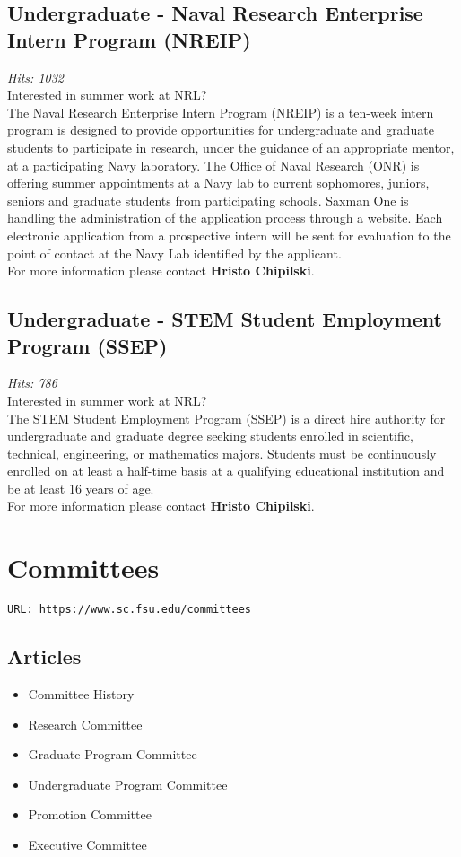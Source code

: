 \documentclass[12pt,a4paper]{article}
\begin{document}
\subsection{Undergraduate - Naval Research Enterprise Intern Program (NREIP)}
\textit{Hits: 1032} \\
Interested in summer work at NRL? \\
The Naval Research Enterprise Intern Program (NREIP) is a ten-week intern program is designed to provide opportunities for undergraduate and graduate students to participate in research, under the guidance of an appropriate mentor, at a participating Navy laboratory. The Office of Naval Research (ONR) is offering summer appointments at a Navy lab to current sophomores, juniors, seniors and graduate students from participating schools. Saxman One is handling the administration of the application process through a website. Each electronic application from a prospective intern will be sent for evaluation to the point of contact at the Navy Lab identified by the applicant. \\
For more information please contact \textbf{Hristo Chipilski}.

\subsection{Undergraduate - STEM Student Employment Program (SSEP)}
\textit{Hits: 786} \\
Interested in summer work at NRL? \\
The STEM Student Employment Program (SSEP) is a direct hire authority for undergraduate and graduate degree seeking students enrolled in scientific, technical, engineering, or mathematics majors. Students must be continuously enrolled on at least a half-time basis at a qualifying educational institution and be at least 16 years of age. \\
For more information please contact \textbf{Hristo Chipilski}.

\section{Committees}
\texttt{URL: https://www.sc.fsu.edu/committees}

\subsection*{Articles}
\begin{itemize}
    \item Committee History
    \item Research Committee
    \item Graduate Program Committee
    \item Undergraduate Program Committee
    \item Promotion Committee
    \item Executive Committee
\end{itemize}
\end{document}
